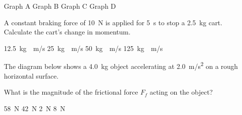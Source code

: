 \documentclass[]{exam}
\begin{document}
\begin{questions}
{\color{white} \tiny
\begin{randomizeoneparchoices}[norandomize]
    \choice Graph A
    \correctchoice Graph B
    \choice Graph C
    \choice Graph D
\end{randomizeoneparchoices}
}

\question
A constant braking force of \SI{10}{N} is applied for \SI{5}{s} to stop a \SI{2.5}{kg} cart.  Calculate the cart's change in momentum.

\begin{randomizeoneparchoices}
    \choice \SI{12.5}{kg\cdot m/s}
    \choice \SI{25}{kg\cdot m/s}
    \correctchoice \SI{50}{kg\cdot m/s}
    \choice \SI{125}{kg\cdot m/s}
\end{randomizeoneparchoices}

\question
The diagram below shows a \SI{4.0}{kg} object accelerating at \SI{2.0}{m/s^2} on a rough horizontal surface. 

\begin{center}
\end{center}

What is the magnitude of the frictional force $F_f$ acting on the object?

\begin{randomizechoices}
    \choice \SI{58}{N}
    \correctchoice \SI{42}{N}
    \choice \SI{2}{N}
    \choice \SI{8}{N}
\end{randomizechoices}

\clearpage
\printkeytable


\end{questions}
\end{document}
